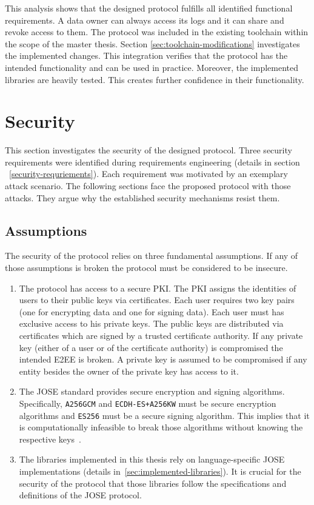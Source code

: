 \documentclass[../main.tex]{subfiles}
\begin{document}
This analysis shows that the designed protocol fulfills all identified functional requirements.
A data owner can always access its logs and it can share and revoke access to them.
The protocol was included in the existing toolchain within the scope of the master thesis.
Section \ref{sec:toolchain-modifications} investigates the implemented changes.
This integration verifies that the protocol has the intended functionality and can be used in practice.
Moreover, the implemented libraries are heavily tested.
This creates further confidence in their functionality.

\section{Security}
\label{sec:evaluation-sec}

This section investigates the security of the designed protocol.
Three security requirements were identified during requirements engineering (details in section ~\ref{security-requriements}).
Each requirement was motivated by an exemplary attack scenario.
The following sections face the proposed protocol with those attacks.
They argue why the established security mechanisms resist them.

\subsection{Assumptions}

The security of the protocol relies on three fundamental assumptions.
If any of those assumptions is broken the protocol must be considered to be insecure.

\begin{enumerate}
    \item 
    The protocol has access to a secure PKI.
    The PKI assigns the identities of users to their public keys via certificates.
    Each user requires two key pairs (one for encrypting data and one for signing data).
    Each user must has exclusive access to his private keys.
    The public keys are distributed via certificates which are signed by a trusted certificate authority.
    If any private key (either of a user or of the certificate authority) is compromised the intended E2EE is broken.
    A private key is assumed to be compromised if any entity besides the owner of the private key has access to it.
    
    \item 
    The JOSE standard provides secure encryption and signing algorithms.
    Specifically, \verb|A256GCM| and \verb|ECDH-ES+A256KW| must be secure encryption algorithms and \verb|ES256| must be a secure signing algorithm.
    This implies that it is computationally infeasible to break those algorithms without knowing the respective keys~\cite{Katz2020}.
    \item 
    The libraries implemented in this thesis rely on language-specific JOSE implementations (details in~\ref{sec:implemented-libraries}).
    It is crucial for the security of the protocol that those libraries follow the specifications and definitions of the JOSE protocol.
\end{enumerate}
\end{document}
